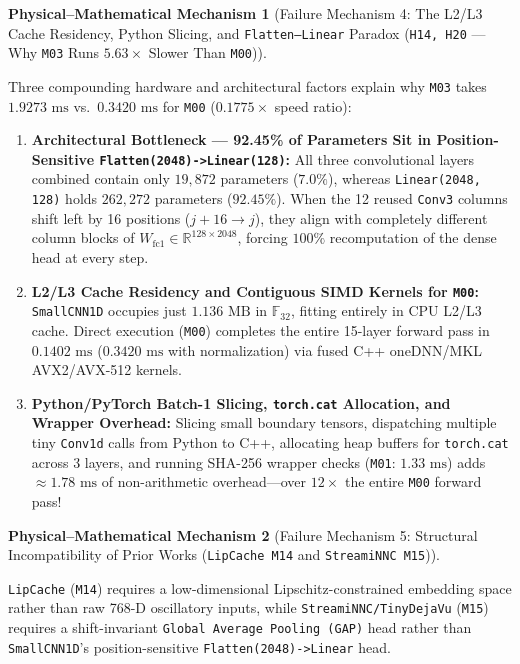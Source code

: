 \documentclass[11pt,a4paper]{article}
\newcommand{\R}{\mathbb{R}}
\newcommand{\F}{\mathbb{F}}
\newcommand{\code}[1]{{\small\ttfamily\nolinkurl{#1}}}
\newtheorem{mechanism}{Physical--Mathematical Mechanism}[section]
\begin{document}
\begin{mechanism}[Failure Mechanism 4: The L2/L3 Cache Residency, Python Slicing, and \texttt{Flatten--Linear} Paradox (\code{H14, H20} --- Why \code{M03} Runs $5.63\times$ Slower Than \code{M00})]
\end{mechanism}
Three compounding hardware and architectural factors explain why \code{M03} takes $1.9273\text{ ms}$ vs.\ $0.3420\text{ ms}$ for \code{M00} ($0.1775\times$ speed ratio):
\begin{enumerate}
  \item \textbf{Architectural Bottleneck --- 92.45\% of Parameters Sit in Position-Sensitive \code{Flatten(2048)->Linear(128)}:}
  All three convolutional layers combined contain only $19,872$ parameters ($7.0\%$), whereas \code{Linear(2048, 128)} holds $262,272$ parameters ($92.45\%$). When the 12 reused \code{Conv3} columns shift left by 16 positions ($j+16 \to j$), they align with completely different column blocks of $W_{\text{fc1}} \in \R^{128 \times 2048}$, forcing $100\%$ recomputation of the dense head at every step.
  \item \textbf{L2/L3 Cache Residency and Contiguous SIMD Kernels for \code{M00}:}
  \code{SmallCNN1D} occupies just $1.136\text{ MB}$ in $\F_{32}$, fitting entirely in CPU L2/L3 cache. Direct execution (\code{M00}) completes the entire 15-layer forward pass in $0.1402\text{ ms}$ ($0.3420\text{ ms}$ with normalization) via fused C++ oneDNN/MKL AVX2/AVX-512 kernels.
  \item \textbf{Python/PyTorch Batch-1 Slicing, \code{torch.cat} Allocation, and Wrapper Overhead:}
  Slicing small boundary tensors, dispatching multiple tiny \code{Conv1d} calls from Python to C++, allocating heap buffers for \code{torch.cat} across 3 layers, and running SHA-256 wrapper checks (\code{M01}: $1.33\text{ ms}$) adds $\approx 1.78\text{ ms}$ of non-arithmetic overhead---over $12\times$ the entire \code{M00} forward pass!
\end{enumerate}

\begin{mechanism}[Failure Mechanism 5: Structural Incompatibility of Prior Works (\code{LipCache M14} and \code{StreamiNNC M15})]
\end{mechanism}
\code{LipCache} (\code{M14}) requires a low-dimensional Lipschitz-constrained embedding space rather than raw 768-D oscillatory inputs, while \code{StreamiNNC/TinyDejaVu} (\code{M15}) requires a shift-invariant \code{Global Average Pooling (GAP)} head rather than \code{SmallCNN1D}'s position-sensitive \code{Flatten(2048)->Linear} head.
\end{document}
